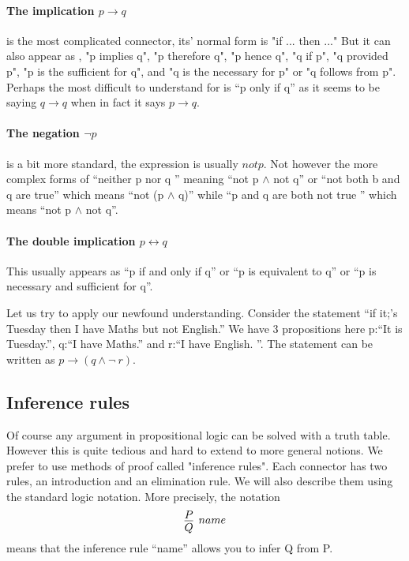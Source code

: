 \begin{itemize}
 \paragraph{\bf The implication $p \rightarrow q$} is the most complicated connector, its' normal form is  "if ... then ..."  But it can also appear as , "p implies q", "p therefore q", "p hence q", "q if p", "q provided p",  "p is the sufficient for q", and "q is the necessary for  p" or "q follows from p". Perhaps the most difficult to understand for is ``p only if q'' as it seems to be saying $q\rightarrow q$ when in fact it says $p\rightarrow q$.
 
\paragraph{\bf The negation $\neg p$} is a bit more standard, the expression is usually $not p$. Not however the more complex forms of ``neither  p nor q '' meaning ``not p $\land$ not q'' or ``not both b and q are true'' which means ``not (p $\land$ q)'' while ``p and q are both not true '' which means ``not p $\land$ not q''.


\paragraph{\bf The double implication $p \leftrightarrow q$} This usually appears as ``p if and only if q'' or ``p is equivalent to q'' or ``p is necessary and sufficient for q''.

 Let us try to apply our newfound understanding. Consider the statement ``if it;'s Tuesday then I have Maths but not English.'' We have 3 propositions here p:``It is Tuesday.'', q:``I have Maths.'' and r:``I have English. ''. The statement can be written as $p\rightarrow (q \land \neg\ r)$.
 
 
 
 
 
 
\subsection{Inference rules}\label{subset:inference}


Of course any argument in propositional logic can be solved with a truth table. However this is quite tedious and hard to extend to more general notions. We prefer to use methods of proof called "inference rules".
Each connector has two rules, an introduction and an elimination rule. We will also describe them using the standard logic notation. More precisely, the notation
$$\infer[name]{Q}{P}$$
means that the inference rule ``name'' allows you to infer Q from P.




\end{itemize}

